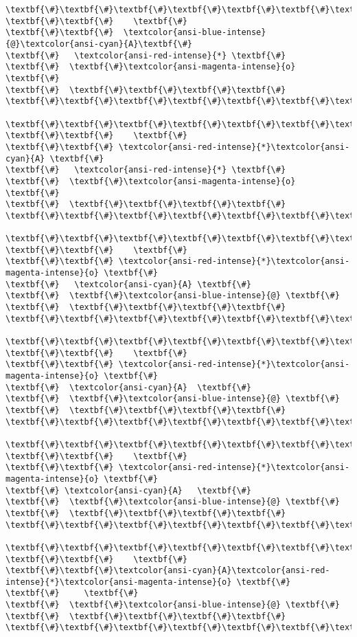 \documentclass[11pt]{article}
\begin{document}
\begin{Verbatim}[commandchars=\\\{\}]
\textbf{\#}\textbf{\#}\textbf{\#}\textbf{\#}\textbf{\#}\textbf{\#}\textbf{\#}
\textbf{\#}\textbf{\#}    \textbf{\#}
\textbf{\#}\textbf{\#}  \textcolor{ansi-blue-intense}{@}\textcolor{ansi-cyan}{A}\textbf{\#}
\textbf{\#}   \textcolor{ansi-red-intense}{*} \textbf{\#}
\textbf{\#}  \textbf{\#}\textcolor{ansi-magenta-intense}{o} \textbf{\#}
\textbf{\#}  \textbf{\#}\textbf{\#}\textbf{\#}\textbf{\#}
\textbf{\#}\textbf{\#}\textbf{\#}\textbf{\#}\textbf{\#}\textbf{\#}\textbf{\#}

\textbf{\#}\textbf{\#}\textbf{\#}\textbf{\#}\textbf{\#}\textbf{\#}\textbf{\#}
\textbf{\#}\textbf{\#}    \textbf{\#}
\textbf{\#}\textbf{\#} \textcolor{ansi-red-intense}{*}\textcolor{ansi-cyan}{A} \textbf{\#}
\textbf{\#}   \textcolor{ansi-red-intense}{*} \textbf{\#}
\textbf{\#}  \textbf{\#}\textcolor{ansi-magenta-intense}{o} \textbf{\#}
\textbf{\#}  \textbf{\#}\textbf{\#}\textbf{\#}\textbf{\#}
\textbf{\#}\textbf{\#}\textbf{\#}\textbf{\#}\textbf{\#}\textbf{\#}\textbf{\#}

\textbf{\#}\textbf{\#}\textbf{\#}\textbf{\#}\textbf{\#}\textbf{\#}\textbf{\#}
\textbf{\#}\textbf{\#}    \textbf{\#}
\textbf{\#}\textbf{\#} \textcolor{ansi-red-intense}{*}\textcolor{ansi-magenta-intense}{o} \textbf{\#}
\textbf{\#}   \textcolor{ansi-cyan}{A} \textbf{\#}
\textbf{\#}  \textbf{\#}\textcolor{ansi-blue-intense}{@} \textbf{\#}
\textbf{\#}  \textbf{\#}\textbf{\#}\textbf{\#}\textbf{\#}
\textbf{\#}\textbf{\#}\textbf{\#}\textbf{\#}\textbf{\#}\textbf{\#}\textbf{\#}

\textbf{\#}\textbf{\#}\textbf{\#}\textbf{\#}\textbf{\#}\textbf{\#}\textbf{\#}
\textbf{\#}\textbf{\#}    \textbf{\#}
\textbf{\#}\textbf{\#} \textcolor{ansi-red-intense}{*}\textcolor{ansi-magenta-intense}{o} \textbf{\#}
\textbf{\#}  \textcolor{ansi-cyan}{A}  \textbf{\#}
\textbf{\#}  \textbf{\#}\textcolor{ansi-blue-intense}{@} \textbf{\#}
\textbf{\#}  \textbf{\#}\textbf{\#}\textbf{\#}\textbf{\#}
\textbf{\#}\textbf{\#}\textbf{\#}\textbf{\#}\textbf{\#}\textbf{\#}\textbf{\#}

\textbf{\#}\textbf{\#}\textbf{\#}\textbf{\#}\textbf{\#}\textbf{\#}\textbf{\#}
\textbf{\#}\textbf{\#}    \textbf{\#}
\textbf{\#}\textbf{\#} \textcolor{ansi-red-intense}{*}\textcolor{ansi-magenta-intense}{o} \textbf{\#}
\textbf{\#} \textcolor{ansi-cyan}{A}   \textbf{\#}
\textbf{\#}  \textbf{\#}\textcolor{ansi-blue-intense}{@} \textbf{\#}
\textbf{\#}  \textbf{\#}\textbf{\#}\textbf{\#}\textbf{\#}
\textbf{\#}\textbf{\#}\textbf{\#}\textbf{\#}\textbf{\#}\textbf{\#}\textbf{\#}

\textbf{\#}\textbf{\#}\textbf{\#}\textbf{\#}\textbf{\#}\textbf{\#}\textbf{\#}
\textbf{\#}\textbf{\#}    \textbf{\#}
\textbf{\#}\textbf{\#}\textcolor{ansi-cyan}{A}\textcolor{ansi-red-intense}{*}\textcolor{ansi-magenta-intense}{o} \textbf{\#}
\textbf{\#}     \textbf{\#}
\textbf{\#}  \textbf{\#}\textcolor{ansi-blue-intense}{@} \textbf{\#}
\textbf{\#}  \textbf{\#}\textbf{\#}\textbf{\#}\textbf{\#}
\textbf{\#}\textbf{\#}\textbf{\#}\textbf{\#}\textbf{\#}\textbf{\#}\textbf{\#}


\end{Verbatim}
\end{document}
